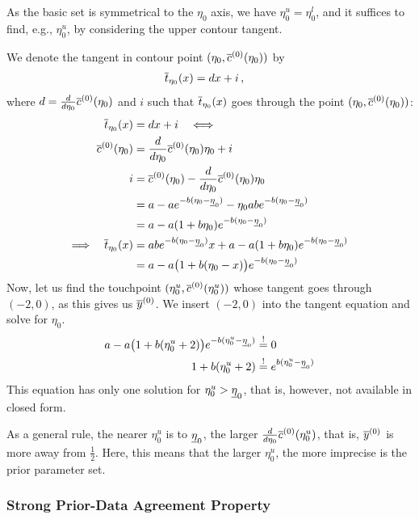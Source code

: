As the basic set is symmetrical to the $\eta_0$ axis, we have $\eta_0^u = \eta_0^l$,
and it suffices to find, e.g., $\eta_0^u$, by considering the upper contour tangent.

We denote the tangent in contour point $(\eta_0,\overline{c}^{(0)}(\eta_0))$ by
\begin{align*}
\overline{t}_{\eta_0}(x) &= dx + i\,,
\end{align*}
where $d = \frac{d}{d\eta_0} \overline{c}^{(0)}(\eta_0)$ and
$i$ such that $\overline{t}_{\eta_0}(x)$ goes through the point $(\eta_0,\overline{c}^{(0)}(\eta_0))$:
\begin{align*}
\overline{t}_{\eta_0}(x) &= dx + i \quad \Longleftrightarrow\\
\overline{c}^{(0)}(\eta_0) &= \frac{d}{d\eta_0} \overline{c}^{(0)}(\eta_0) \eta_0 + i \\
i &= \overline{c}^{(0)}(\eta_0) -\frac{d}{d\eta_0} \overline{c}^{(0)}(\eta_0) \eta_0 \\
  &= a - a e^{-b(\eta_0 - \underline{\eta}_0)} - \eta_0 ab e^{-b(\eta_0 - \underline{\eta}_0)} \\
  &= a - a (1 + b \eta_0) e^{-b(\eta_0 - \underline{\eta}_0)} \\
\Longrightarrow\quad
\overline{t}_{\eta_0}(x) &= ab e^{-b(\eta_0 - \underline{\eta}_0)} x + a - a (1 + b \eta_0) e^{-b(\eta_0 - \underline{\eta}_0)} \\
                   &= a - a \big(1 + b(\eta_0-x)\big) e^{-b(\eta_0 - \underline{\eta}_0)}
\end{align*}
Now, let us find the touchpoint $(\eta_0^u, \overline{c}^{(0)}(\eta_0^u))$ whose tangent goes through $(-2,0)$, as this gives us $\overline{y}^{(0)}$.
We insert $(-2,0)$ into the tangent equation and solve for $\eta_0$.
\begin{align}
a - a \big(1 + b(\eta_0^u + 2)\big) e^{-b(\eta_0^u - \underline{\eta}_0)} &\stackrel{!}{=} 0 \nonumber\\
1 + b(\eta_0^u + 2) &\stackrel{!}{=} e^{b(\eta_0^u - \underline{\eta}_0)} \label{eq:eta0u}
\end{align}
This equation has only one solution for $\eta_0^u > \underline{\eta}_0$, that is,
however, not available in closed form.

As a general rule, the nearer $\eta_0^u$ is to $\underline{\eta}_0$, the larger $\frac{d}{d\eta_0} \overline{c}^{(0)}(\eta_0^u)$,
that is, $\overline{y}^{(0)}$ %
is more away from $\frac{1}{2}$.
Here, this means that the larger $\eta_0^u$, the more imprecise is the prior parameter set.

\subsubsection{Strong Prior-Data Agreement Property}
\label{sec:spda-property}

